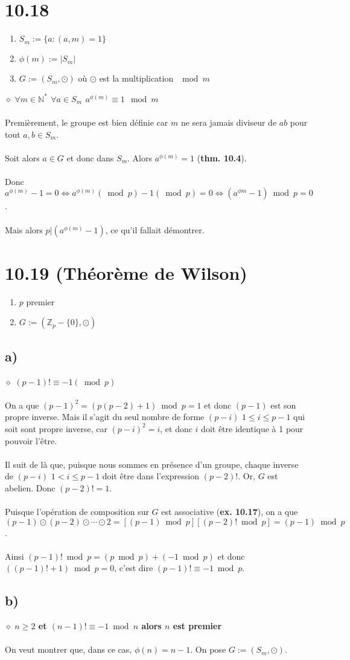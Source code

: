 \documentclass[a4paper,10pt]{article}
\begin{document}
\section*{10.18}
\begin{enumerate}
 \item $S_m := \{a : (a,m) = 1\}$
 \item $\phi(m) := |S_m|$
 \item $G := (S_m, \odot)$ où $\odot$ est la multiplication $\mod{m}$
\end{enumerate}
$\diamond$ \textbf{$\forall m \in \mathbb{N}^*$ $\forall a \in S_m$ $a^{\phi(m)} \equiv 1 \mod{m}$}
\\
\\
Premièrement, le groupe est bien définie car $m$ ne sera jamais diviseur de $ab$ pour tout $a,b \in S_m$. 
\\
\\
Soit alors $a \in G$ et donc dans $S_m$. Alors $a^{\phi(m)} = 1$ (\textbf{thm. 10.4}).
\\
\\
Donc $a^{\phi(m)} - 1 = 0 \Leftrightarrow a^{\phi(m)} (\bmod p) - 1 (\bmod p) = 0 \Leftrightarrow (a^{\phi{m}} - 1) \bmod p = 0$.
\\
\\
Mais alors $p | (a^{\phi(m)} - 1)$, ce qu'il fallait démontrer.

\section*{10.19 (Théorème de Wilson)}
\begin{enumerate}
 \item $p$ premier
 \item $G := (\mathbb{Z}_p - \{0\}, \odot)$
\end{enumerate}
\subsection*{a)}
$\diamond$ \textbf{$(p-1)! \equiv -1 (\bmod p)$}
\\
\\
On a que $(p-1)^2 = (p(p-2) + 1)\bmod p = 1$ et donc $(p-1)$ est son propre inverse. Mais il s'agit du seul nombre de forme
$(p-i)$ $1 \leq i \leq p-1$ qui soit sont propre inverse, car $(p-i)^2 = i$, et donc $i$ doit être identique à 1 pour pouvoir l'être.
\\
\\
Il suit de là que, puisque nous sommes en présence d'un groupe, chaque inverse de $(p-i)$ $ 1 < i \leq p-1$ doit être dans l'expression
$(p-2)!$. Or, $G$ est abelien. Donc $(p-2)! = 1$. 
\\
\\
Puisque l'opération de composition sur $G$ est associative (\textbf{ex. 10.17}), on a que $(p-1) \odot (p-2) \odot \cdots \odot 2 = [(p-1)\bmod p][(p-2)! \bmod p] = (p-1) \bmod p$. 
\\
\\
Ainsi $(p-1)! \bmod p = (p \bmod p) + (-1 \bmod p) $ et donc $((p-1)! + 1) \bmod p = 0$, c'est dire $(p-1)! \equiv -1 \bmod p$.
\subsection*{b)}
$\diamond$ \textbf{$n \geq 2$ et $(n-1)! \equiv -1 \bmod n$ alors $n$ est premier}
\\
\\
On veut montrer que, dans ce cas, $\phi(n) = n-1$. On pose $G := (S_m, \odot)$.
\end{document}
